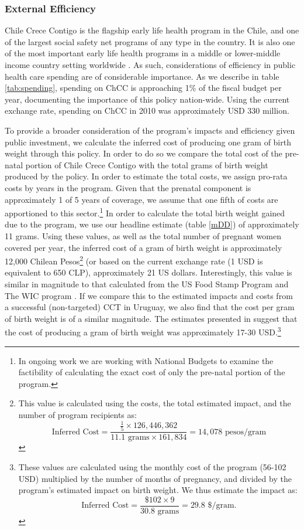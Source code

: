 \documentclass[12pt]{article}
\begin{document}
\begin{spacing}{1.4}
\subsubsection{External Efficiency}
Chile Crece Contigo is the flagship early life health program
in the Chile, and one of the largest social safety net programs
of any type in the country.  It is also one of the most
important early life health programs in a middle or lower-middle
income country setting worldwide \citep{Richteretal2017}.  As
such, considerations of efficiency in public health care spending
are of considerable importance.  As we describe in table
\ref{tab:spending}, spending on ChCC is approaching 1\% of the
fiscal budget per year, documenting the importance of this policy
nation-wide.  Using the current exchange rate, spending on ChCC
in 2010 was approximately USD 330 million.

To provide a broader consideration of the program's impacts and
efficiency given public investment, we calculate the inferred
cost of producing one gram of birth weight through this policy.
In order to do so we compare the total cost of the pre-natal
portion of Chile Crece Contigo with the total grams of birth
weight produced by the policy.  In order to estimate the total
costs, we assign pro-rata costs by years in the program.  Given
that the prenatal component is approximately 1 of 5 years of
coverage, we assume that one fifth of costs are apportioned to this
sector.\footnote{In ongoing work we are working with National
  Budgets to examine the factibility of calculating the exact
  cost of only the pre-natal portion of the program.}  In order
to calculate the total birth weight gained due to the program, we
use our headline estimate (table \ref{mDD}) of approximately 11
grams.  Using these values, as well as the total number of
pregnant women covered per year, the inferred cost of a gram of
birth weight is approximately 12,000 Chilean Pesos\footnote{This
  value is calculated using the costs, the total estimated impact,
  and the number of program recipients as:
  \[
  \text{Inferred Cost}=\frac{\frac{1}{5}\times 126,446,362}{11.1 \text{ grams}\times161,834}=14,078 \text{ pesos/gram}
  \]} (or based on the
current exchange rate (1 USD is equivalent to 650 CLP),
approximately 21 US dollars.  Interestingly, this value is similar
in magnitude to that calculated from the US Food Stamp Program and
The WIC program \citep{Clarkeetal2017}.  If we compare this to
the estimated impacts and costs from a successful (non-targeted)
CCT in Uruguay, we also find that the cost per gram of birth weight
is of a similar magnitude.  The estimates presented in
\citet{Amaranteetal2014} suggest that the cost of producing a
gram of birth weight was approximately 17-30 USD.\footnote{These
  values are calculated using the monthly cost of the program
  (56-102 USD) multiplied by the number of months of pregnancy,
  and divided by the program's estimated impact on birth weight.
  We thus estimate the impact as:
  \[
  \text{Inferred Cost}=\frac{\$102\times 9}{30.8 \text{ grams}}=29.8 \text{ \$/gram}.
  \]
}


\end{spacing}
\end{document}
